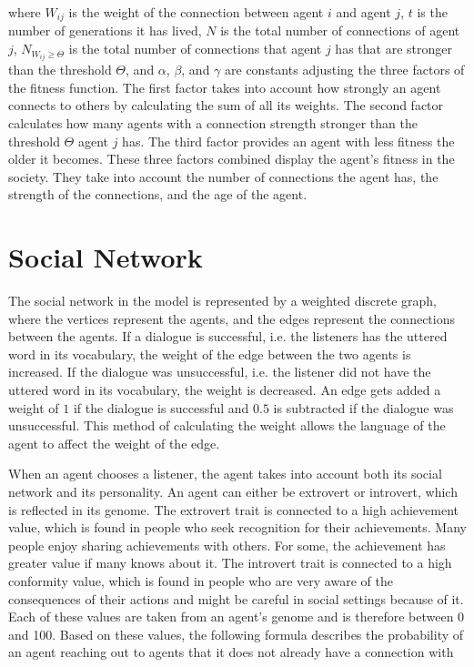 where $W_{ij}$ is the weight of the connection between agent $i$ and agent $j$, $t$ is the number of generations it has lived, $N$ is the total number of connections of agent $j$, $ N_{W_{ij} \geq \Theta}$ is the total number of connections that agent $j$ has that are stronger than the threshold $\Theta$, and $\alpha$, $\beta$, and $\gamma$ are constants adjusting the three factors of the fitness function. The first factor takes into account how strongly an agent connects to others by calculating the sum of all its weights. The second factor calculates how many agents with a connection strength stronger than the threshold $\Theta$ agent $j$ has. The third factor provides an agent with less fitness the older it becomes. These three factors combined display the agent’s fitness in the society. They take into account the number of connections the agent has, the strength of the connections, and the age of the agent.

\section{Social Network}

The social network in the model is represented by a weighted discrete graph, where the vertices represent the agents, and the edges represent the connections between the agents. If a dialogue is successful, i.e. the listeners has the uttered word in its vocabulary, the weight of the edge between the two agents is increased. If the dialogue was unsuccessful, i.e. the listener did not have the uttered word in its vocabulary, the weight is decreased. An edge gets added a weight of $1$ if the dialogue is successful and $0.5$ is subtracted if the dialogue was unsuccessful. This method of calculating the weight allows the language of the agent to affect the weight of the edge.

When an agent chooses a listener, the agent takes into account both its social network and its personality. An agent can either be extrovert or introvert, which is reflected in its genome. The extrovert trait is connected to a high achievement value, which is found in people who seek recognition for their achievements. Many people enjoy sharing achievements with others. For some, the achievement has greater value if many knows about it. The introvert trait is connected to a high conformity value, which is found in people who are very aware of the consequences of their actions and might be careful in social settings because of it. Each of these values are taken from an agent’s genome and is therefore between 0 and 100. Based on these values, the following formula describes the probability of an agent reaching out to agents that it does not already have a connection with

